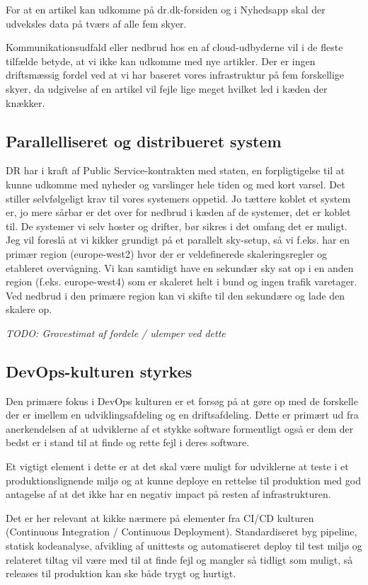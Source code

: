 \documentclass{article}
\begin{document}
For at en artikel kan udkomme på dr.dk-forsiden og i Nyhedsapp skal der udveksles data på tværs af alle fem skyer.

Kommunikationsudfald eller nedbrud hos en af cloud-udbyderne vil i de fleste tilfælde betyde, at vi ikke kan udkomme med nye artikler. Der er ingen driftsmæssig fordel ved at vi har baseret vores infrastruktur på fem forskellige skyer, da udgivelse af en artikel vil fejle lige meget hvilket led i kæden der knækker. 

\subsection{Parallelliseret og distribueret system}
DR har i kraft af Public Service-kontrakten med staten, en forpligtigelse til at kunne udkomme med nyheder og varslinger hele tiden og med kort varsel.
Det stiller selvfølgeligt krav til vores systemers oppetid. Jo tættere koblet et system er, jo mere sårbar er det over for nedbrud i kæden af de systemer, det er koblet til.
De systemer vi selv hoster og drifter, bør sikres i det omfang det er muligt. Jeg vil foreslå at vi kikker grundigt på et parallelt sky-setup, så vi f.eks. har en primær region (europe-west2) hvor der er veldefinerede skaleringsregler og etableret overvågning.
Vi kan samtidigt have en sekundær sky sat op i en anden region (f.eks. europe-west4) som er skaleret helt i bund og ingen trafik varetager.
Ved nedbrud i den primære region kan vi skifte til den sekundære og lade den skalere op.

    \textit{TODO: Grovestimat af fordele / ulemper ved dette}


\subsection{DevOps-kulturen styrkes}
Den primære fokus i DevOps kulturen er et forsøg på at gøre op med de forskelle der er imellem en udviklingsafdeling og en driftsafdeling. Dette er primært ud fra anerkendelsen af at udviklerne af et stykke software formentligt også er dem der bedst er i stand til at finde og rette fejl i deres software.

Et vigtigt element i dette er at det skal være muligt for udviklerne at teste i et produktionslignende miljø og at kunne deploye en rettelse til produktion med god antagelse af at det ikke har en negativ impact på resten af infrastrukturen. 

Det er her relevant at kikke nærmere på elementer fra CI/CD kulturen (Continuous Integration / Continuous Deployment). Standardiseret byg pipeline, statisk kodeanalyse, afvikling af unittests og automatiseret deploy til test miljø og relateret tiltag vil være med til at finde fejl og mangler så tidligt som muligt, så releases til produktion kan ske både trygt og hurtigt.
\end{document}
